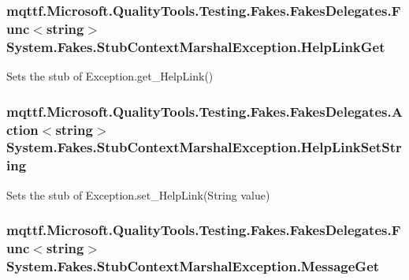 \hypertarget{class_system_1_1_fakes_1_1_stub_context_marshal_exception_a08598099267345029078a0763fab7b9c}{
\subsubsection[{Help\-Link\-Get}]{\setlength{\rightskip}{0pt plus 5cm}mqttf.\-Microsoft.\-Quality\-Tools.\-Testing.\-Fakes.\-Fakes\-Delegates.\-Func$<$string$>$ System.\-Fakes.\-Stub\-Context\-Marshal\-Exception.\-Help\-Link\-Get}}\label{class_system_1_1_fakes_1_1_stub_context_marshal_exception_a08598099267345029078a0763fab7b9c}


Sets the stub of Exception.\-get\-\_\-\-Help\-Link()

\hypertarget{class_system_1_1_fakes_1_1_stub_context_marshal_exception_ac481c7bdce8242d2d5c0106b8ea6bb42}{
\subsubsection[{Help\-Link\-Set\-String}]{\setlength{\rightskip}{0pt plus 5cm}mqttf.\-Microsoft.\-Quality\-Tools.\-Testing.\-Fakes.\-Fakes\-Delegates.\-Action$<$string$>$ System.\-Fakes.\-Stub\-Context\-Marshal\-Exception.\-Help\-Link\-Set\-String}}\label{class_system_1_1_fakes_1_1_stub_context_marshal_exception_ac481c7bdce8242d2d5c0106b8ea6bb42}


Sets the stub of Exception.\-set\-\_\-\-Help\-Link(\-String value)

\hypertarget{class_system_1_1_fakes_1_1_stub_context_marshal_exception_ab86dcd95d85bdd1c0c07eb235f9c2c98}{
\subsubsection[{Message\-Get}]{\setlength{\rightskip}{0pt plus 5cm}mqttf.\-Microsoft.\-Quality\-Tools.\-Testing.\-Fakes.\-Fakes\-Delegates.\-Func$<$string$>$ System.\-Fakes.\-Stub\-Context\-Marshal\-Exception.\-Message\-Get}}\label{class_system_1_1_fakes_1_1_stub_context_marshal_exception_ab86dcd95d85bdd1c0c07eb235f9c2c98}


